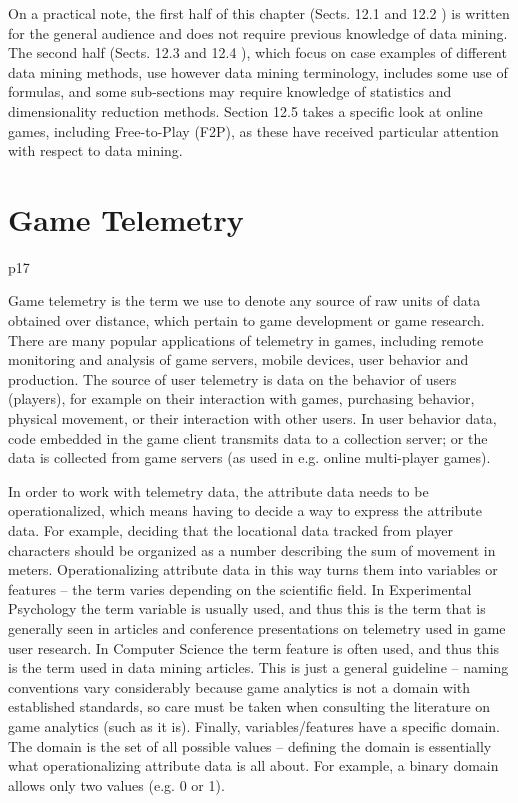 On a practical note, the first half of this chapter (Sects. 12.1 and 12.2 ) is written for the general audience and does not require previous knowledge of data mining. The second half (Sects. 12.3 and 12.4 ), which focus on case examples of different data mining methods, use however data mining terminology, includes some use of formulas, and some sub-sections may require knowledge of statistics and dimensionality reduction methods. Section 12.5 takes a specific look at online games, including Free-to-Play (F2P), as these have received particular attention with respect to data mining.

\section{Game Telemetry}

p17

Game telemetry is the term we use to denote any source of raw units of data obtained over distance, which pertain to game development or game research. There are many popular applications of telemetry in games, including remote monitoring and analysis of game servers, mobile devices, user behavior and production. The source of user telemetry is data on the behavior of users (players), for example on their interaction with games, purchasing behavior, physical movement, or their interaction with other users. In user behavior data, code embedded in the game client transmits data to a collection server; or the data is collected from game servers (as used in e.g. online multi-player games).

In order to work with telemetry data, the attribute data needs to be operationalized, which means having to decide a way to express the attribute data. For example, deciding that the locational data tracked from player characters should be organized as a number describing the sum of movement in meters. Operationalizing attribute data in this way turns them into variables or features – the term varies depending on the scientific field. In Experimental Psychology the term variable is usually used, and thus this is the term that is generally seen in articles and conference presentations on telemetry used in game user research. In Computer Science the term feature is often used, and thus this is the term used in data mining articles. This is just a general guideline – naming conventions vary considerably because game analytics is not a domain with established standards, so care must be taken when consulting the literature on game analytics (such as it is). Finally, variables/features have a specific domain. The domain is the set of all possible values – defining the domain is essentially what operationalizing attribute data is all about. For example, a binary domain allows only two values (e.g. 0 or 1).


